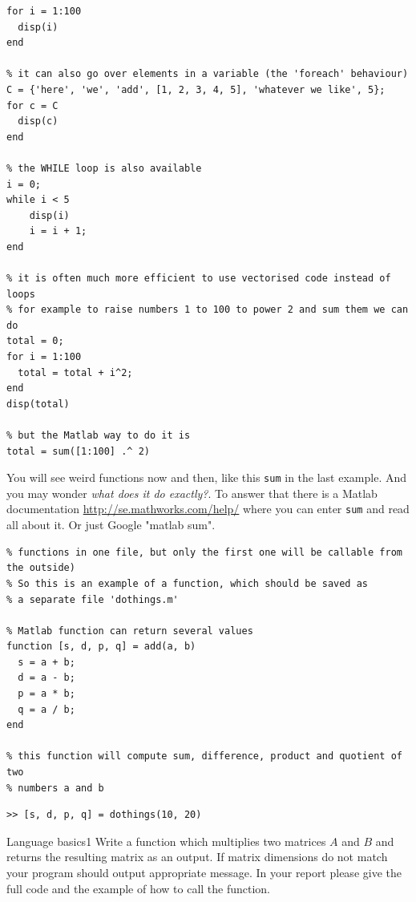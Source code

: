 \documentclass[a4paper,11pt]{article}
\begin{document}
\begin{lstlisting}[caption = {Loops}]
% FOR loop is the main guy
for i = 1:100
  disp(i)
end

% it can also go over elements in a variable (the 'foreach' behaviour)
C = {'here', 'we', 'add', [1, 2, 3, 4, 5], 'whatever we like', 5};
for c = C
  disp(c)
end

% the WHILE loop is also available
i = 0;
while i < 5
    disp(i)
    i = i + 1;
end

% it is often much more efficient to use vectorised code instead of loops
% for example to raise numbers 1 to 100 to power 2 and sum them we can do
total = 0;
for i = 1:100
  total = total + i^2;
end
disp(total)

% but the Matlab way to do it is
total = sum([1:100] .^ 2)
\end{lstlisting}

You will see weird functions now and then, like this \texttt{sum} in the last example. And you may wonder \emph{what does it do exactly?}. To answer that there is a Matlab documentation \url{http://se.mathworks.com/help/} where you can enter \texttt{sum} and read all about it. Or just Google "matlab sum".

\begin{lstlisting}[caption = {Creating a function, file \texttt{dothings.m}}]
% Each function in Matlab lives in a separate file (you can have several
% functions in one file, but only the first one will be callable from the outside)
% So this is an example of a function, which should be saved as
% a separate file 'dothings.m'

% Matlab function can return several values
function [s, d, p, q] = add(a, b)
  s = a + b;
  d = a - b;
  p = a * b;
  q = a / b;
end

% this function will compute sum, difference, product and quotient of two
% numbers a and b
\end{lstlisting}

\begin{lstlisting}[caption = {Calling a function}]
% Now once we have our function defined and saved we can call it
>> [s, d, p, q] = dothings(10, 20)
\end{lstlisting}


%
%
\begin{exercise}{1}{Language basics}{1}
Write a function which multiplies two matrices $A$ and $B$ and returns the resulting matrix as an output. If matrix dimensions do not match your program should output appropriate message. In your report please give the full code and the example of how to call the function.
\end{exercise}
\end{document}

